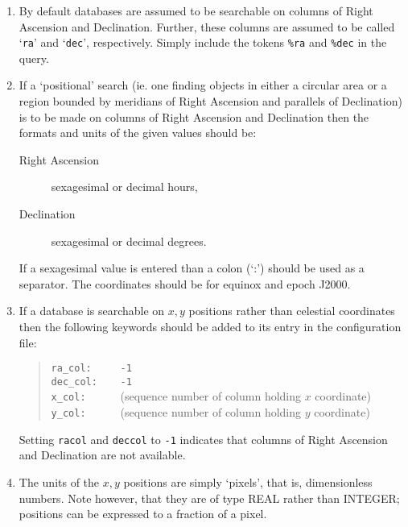 \documentclass[twoside,11pt]{article}
\renewcommand{\_}{\texttt{\symbol{95}}}
\begin{document}
\begin{enumerate}

  \item By default databases are assumed to be searchable on columns
   of Right Ascension and Declination.  Further, these columns are
   assumed to be called `{\tt ra}' and `{\tt dec}', respectively.
   Simply include the tokens {\tt \%ra} and {\tt \%dec} in the query.

  \item If a `positional' search (ie. one finding objects in either a
   circular area or a region bounded by meridians of Right Ascension and
   parallels of Declination) is to be made on columns of Right Ascension
   and Declination then the formats and units of the given values should
   be:

  \begin{description}

    \item[Right Ascension] sexagesimal or decimal hours,

    \item[Declination] sexagesimal or decimal degrees.

  \end{description}

   If a sexagesimal value is entered than a colon (`:') should be used
   as a separator.  The coordinates should be for equinox and epoch J2000.

  \item If a database is searchable on $x,y$\/ positions rather than
   celestial coordinates then the following keywords should be added to
   its entry in the configuration file:

  \begin{quote}
    \verb+ra_col:     -1+  \\
    \verb+dec_col:    -1+  \\
    \verb+x_col:      +(sequence number of column holding $x$\/ coordinate) \\
    \verb+y_col:      +(sequence number of column holding $y$\/ coordinate) 
  \end{quote}

   Setting {\tt ra\_col} and {\tt dec\_col} to {\tt -1} indicates that
   columns of Right Ascension and Declination are not available.

  \item The units of the $x,y$\/ positions are simply `pixels', that is,
   dimensionless numbers.  Note however, that they are of type REAL rather
   than INTEGER; positions can be expressed to a fraction of a pixel.


\end{enumerate}
\end{document}
